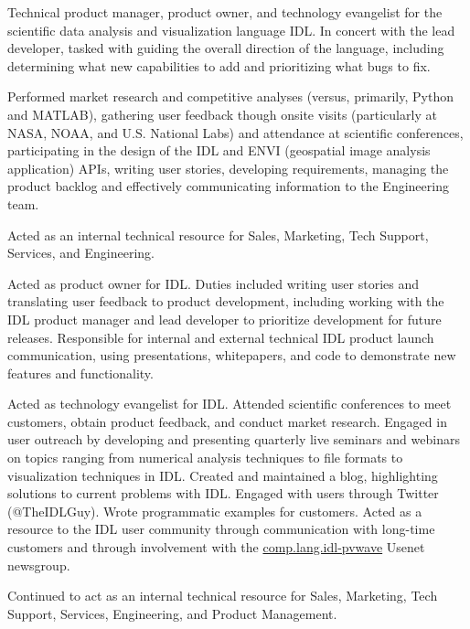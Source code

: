 \documentclass[letterpaper]{resume}
\begin{document}
\begin{compactitem}[\itembullet]
  \item Technical product manager, product owner, and technology
    evangelist for the scientific data analysis and visualization
    language IDL. In concert with the lead developer, tasked with
    guiding the overall direction of the language, including
    determining what new capabilities to add and prioritizing what
    bugs to fix.
  \item Performed market research and competitive analyses (versus,
    primarily, Python and MATLAB), gathering user feedback though
    onsite visits (particularly at NASA, NOAA, and U.S. National Labs)
    and attendance at scientific conferences, participating in the
    design of the IDL and ENVI (geospatial image analysis application)
    APIs, writing user stories, developing requirements, managing the
    product backlog and effectively communicating information to the
    Engineering team.
  \item Acted as an internal technical resource for Sales, Marketing,
    Tech Support, Services, and Engineering.
\end{compactitem}

\begin{compactitem}[\itembullet]
  \item Acted as product owner for IDL. Duties included writing user
    stories and translating user feedback to product development,
    including working with the IDL product manager and lead developer
    to prioritize development for future releases. Responsible for
    internal and external technical IDL product launch communication,
    using presentations, whitepapers, and code to demonstrate new
    features and functionality.
  \item Acted as technology evangelist for IDL. Attended scientific
    conferences to meet customers, obtain product feedback, and
    conduct market research. Engaged in user outreach by developing
    and presenting quarterly live seminars and webinars on topics
    ranging from numerical analysis techniques to file formats to
    visualization techniques in IDL. Created and maintained a blog,
    highlighting solutions to current problems with IDL. Engaged with
    users through Twitter (@TheIDLGuy). Wrote programmatic examples
    for customers. Acted as a resource to the IDL user community
    through communication with long-time customers and through
    involvement with the \url{comp.lang.idl-pvwave} Usenet newsgroup.
  \item Continued to act as an internal technical resource for Sales,
    Marketing, Tech Support, Services, Engineering, and Product
    Management.
\end{compactitem}
\end{document}

